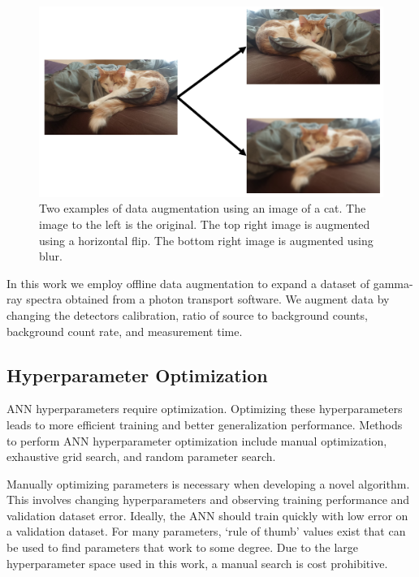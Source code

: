 \begin{figure}[H]
	\centering
	\includegraphics[width=0.9\linewidth]{images/cat}
	\caption{Two examples of data augmentation using an image of a cat. The image to the left is the original. The top right image is augmented using a horizontal flip. The bottom right image is augmented using blur.}
	\label{fig:cat}
\end{figure}

In this work we employ offline data augmentation to expand a dataset of gamma-ray spectra obtained from a photon transport software. We augment data by changing the detectors calibration, ratio of source to background counts, background count rate, and measurement time.


\subsection{Hyperparameter Optimization} \label{section_hp_opt}

ANN hyperparameters require optimization. Optimizing these hyperparameters leads to more efficient training and better generalization performance. Methods to perform ANN hyperparameter optimization include manual optimization, exhaustive grid search, and random parameter search.

Manually optimizing parameters is necessary when developing a novel algorithm. This involves changing hyperparameters and observing training performance and validation dataset error. Ideally, the ANN should train quickly with low error on a validation dataset. For many parameters, `rule of thumb' values exist that can be used to find parameters that work to some degree. Due to the large hyperparameter space used in this work, a manual search is cost prohibitive.

